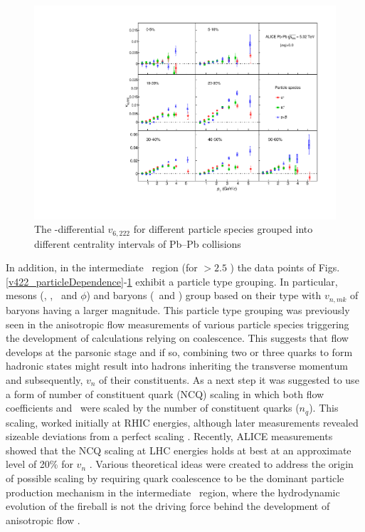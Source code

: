 \begin{figure}[!htb]
\begin{center}
\includegraphics[scale=0.82]{figures/results/All_v6222_gap00_PID2_3by3.pdf}

\end{center}
\caption{The \pT-differential $v_{6,222}$ for different particle species grouped into different centrality intervals of Pb--Pb collisions \sNN}
\label{v6222_particleDependence}
\end{figure}

\newpage

In addition, in the intermediate \pT~region (for \pT $> 2.5$ \GeV) the data points of Figs. \ref{v422_particleDependence}-\ref{v6222_particleDependence} exhibit a particle type grouping. In particular, mesons (\pion, \kaon, \Ks~and $\phi$) and baryons (\proton~and \lambdas) group based on their type with $v_{n,mk}$ of baryons having a larger magnitude. This particle type grouping was previously seen in the anisotropic flow measurements \cite{Abelev:2014pua,Adam:2016nfo,Acharya:2018zuq,Adams:2003am,Abelev:2007qg,Adler:2003kt,Adare:2006ti} of various particle species triggering the development of calculations relying on coalescence. This suggests that flow develops at the parsonic stage and if so, combining two or three quarks to form hadronic states might result into hadrons inheriting the transverse momentum and subsequently, $v_{n}$ of their constituents. As a next step it was suggested to use a form of number of constituent quark (NCQ) scaling in which both flow coefficients and \pT~were scaled by the number of constituent quarks ($n_{q}$). This scaling, worked initially at RHIC energies, although later measurements revealed sizeable deviations from a perfect scaling \cite{Adams:2003am,Abelev:2007qg,Adler:2003kt,Adare:2006ti}. Recently, ALICE measurements showed that the NCQ scaling at LHC energies holds at best at an approximate level of 20\% for $v_{n}$ \cite{Abelev:2014pua,Adam:2016nfo,Acharya:2018zuq}. Various theoretical ideas were created to address the origin of possible scaling by requiring quark coalescence to be the dominant particle production mechanism in the intermediate \pT~region, where the hydrodynamic evolution of the fireball is not the driving force behind the development of anisotropic flow \cite{Voloshin:2002wa,Molnar:2003ff}.

